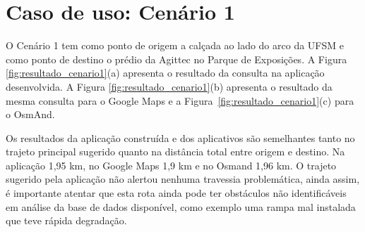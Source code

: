 \documentclass[oneside,openright,12pt]{ufsm_2015} %
\begin{document}
\section{Caso de uso: Cenário 1}

O Cenário 1 tem como
ponto de origem a calçada ao lado do arco da UFSM e como ponto de destino o prédio da Agittec no Parque de Exposições.
A Figura \ref{fig:resultado_cenario1}(a) apresenta o resultado da consulta na aplicação desenvolvida.
A Figura \ref{fig:resultado_cenario1}(b) apresenta o resultado da mesma consulta para o Google Maps e a Figura~\ref{fig:resultado_cenario1}(c) para o OsmAnd.

Os resultados da aplicação construída e dos aplicativos são semelhantes tanto no trajeto principal sugerido quanto na distância total entre origem e destino. 
Na aplicação 1,95 km, no Google Maps 1,9 km e no Osmand 1,96 km.
O trajeto sugerido pela aplicação não alertou nenhuma travessia problemática, ainda assim, é importante atentar que esta rota ainda pode ter obstáculos não identificáveis em análise da base de dados disponível, como exemplo uma rampa mal instalada que teve rápida degradação.
\end{document}
